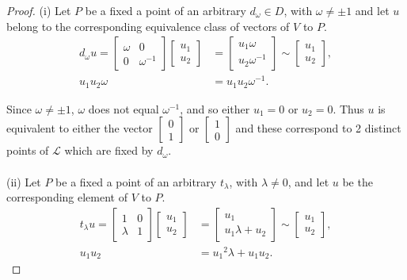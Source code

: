\documentclass[a4paper , 11pt]{book}
\theoremstyle{definition}
\theoremstyle{remark}
\begin{document}
\begin{proof} 
(i) Let $P$ be a fixed a point of an arbitrary $d_\omega \in D$, with $\omega \neq \pm 1$ and let $u$ belong to the corresponding equivalence class of vectors of $V$ to $P$. \\
\begin{align*} d_\omega u = \begin{bmatrix} \omega & 0 \\ 0 & \omega^{-1} \end{bmatrix} \begin{bmatrix} u_1 \\ u_2 \end{bmatrix} &= \begin{bmatrix} u_1 \omega \\ u_2 \omega^{-1} \end{bmatrix} \sim \begin{bmatrix} u_1 \\ u_2 \end{bmatrix}, 
\\[1.5ex] u_1 u_2 \omega &= u_1 u_2 \omega^{-1}.
\end{align*}

Since $\omega \neq \pm 1$, $\omega$ does not equal $\omega^{-1}$, and so either $u_1 = 0$ or $u_2 = 0$. Thus $u$ is equivalent to either the vector $\begin{bmatrix} 0 \\ 1 \end{bmatrix}$ or $\begin{bmatrix} 1 \\ 0 \end{bmatrix}$ and these correspond to 2 distinct points of $\mathscr{L}$ which are fixed by $d_\omega$. \\
\\
(ii) Let $P$ be a fixed a point of an arbitrary $t_\lambda$, with $\lambda \neq 0$, and let $u$ be the corresponding element of $V$ to $P$. \\
\begin{align*} t_\lambda u = \begin{bmatrix} 1 & 0 \\ \lambda & 1 \end{bmatrix} \begin{bmatrix} u_1 \\ u_2 \end{bmatrix} &= \begin{bmatrix} u_1 \\ u_1 \lambda + u_2 \end{bmatrix} \sim \begin{bmatrix} u_1 \\ u_2 \end{bmatrix}, 
\\[1.5ex] u_1 u_2 &= {u_1}^2 \lambda + u_1 u_2.
\end{align*}


\end{proof}
\end{document}
